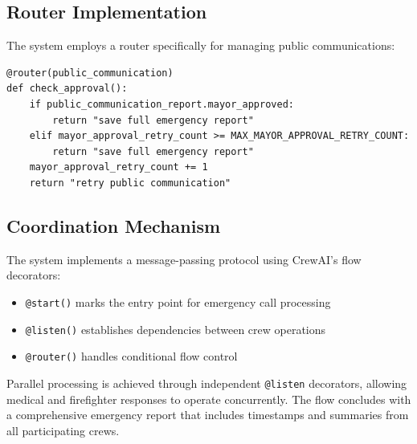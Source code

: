 \subsection{Router Implementation}
The system employs a router specifically for managing public communications:
\begin{lstlisting}[caption={Router Implementation for Public Communication Approval}]
@router(public_communication)
def check_approval():
    if public_communication_report.mayor_approved:
        return "save full emergency report"
    elif mayor_approval_retry_count >= MAX_MAYOR_APPROVAL_RETRY_COUNT:
        return "save full emergency report"
    mayor_approval_retry_count += 1
    return "retry public communication"
\end{lstlisting}

\subsection{Coordination Mechanism}
The system implements a message-passing protocol using CrewAI's flow decorators:
\begin{itemize}
    \item \texttt{@start()} marks the entry point for emergency call processing
    \item \texttt{@listen()} establishes dependencies between crew operations
    \item \texttt{@router()} handles conditional flow control
\end{itemize}

Parallel processing is achieved through independent \texttt{@listen} decorators, allowing medical and firefighter responses to operate concurrently. The flow concludes with a comprehensive emergency report that includes timestamps and summaries from all participating crews.